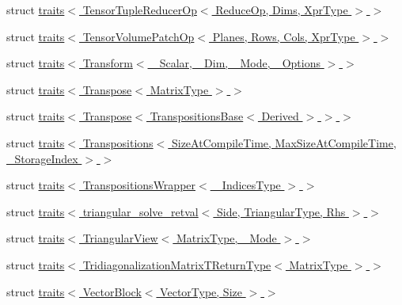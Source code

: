 \begin{DoxyCompactItemize}
\item 
struct \hyperlink{struct_eigen_1_1internal_1_1traits_3_01_tensor_tuple_reducer_op_3_01_reduce_op_00_01_dims_00_01_xpr_type_01_4_01_4}{traits$<$ Tensor\+Tuple\+Reducer\+Op$<$ Reduce\+Op, Dims, Xpr\+Type $>$ $>$}
\item 
struct \hyperlink{struct_eigen_1_1internal_1_1traits_3_01_tensor_volume_patch_op_3_01_planes_00_01_rows_00_01_cols_00_01_xpr_type_01_4_01_4}{traits$<$ Tensor\+Volume\+Patch\+Op$<$ Planes, Rows, Cols, Xpr\+Type $>$ $>$}
\item 
struct \hyperlink{struct_eigen_1_1internal_1_1traits_3_01_transform_3_01___scalar_00_01___dim_00_01___mode_00_01___options_01_4_01_4}{traits$<$ Transform$<$ \+\_\+\+Scalar, \+\_\+\+Dim, \+\_\+\+Mode, \+\_\+\+Options $>$ $>$}
\item 
struct \hyperlink{struct_eigen_1_1internal_1_1traits_3_01_transpose_3_01_matrix_type_01_4_01_4}{traits$<$ Transpose$<$ Matrix\+Type $>$ $>$}
\item 
struct \hyperlink{struct_eigen_1_1internal_1_1traits_3_01_transpose_3_01_transpositions_base_3_01_derived_01_4_01_4_01_4}{traits$<$ Transpose$<$ Transpositions\+Base$<$ Derived $>$ $>$ $>$}
\item 
struct \hyperlink{struct_eigen_1_1internal_1_1traits_3_01_transpositions_3_01_size_at_compile_time_00_01_max_size_a3e3a58d21bfa7053a385355887ee81d}{traits$<$ Transpositions$<$ Size\+At\+Compile\+Time, Max\+Size\+At\+Compile\+Time, \+\_\+\+Storage\+Index $>$ $>$}
\item 
struct \hyperlink{struct_eigen_1_1internal_1_1traits_3_01_transpositions_wrapper_3_01___indices_type_01_4_01_4}{traits$<$ Transpositions\+Wrapper$<$ \+\_\+\+Indices\+Type $>$ $>$}
\item 
struct \hyperlink{struct_eigen_1_1internal_1_1traits_3_01triangular__solve__retval_3_01_side_00_01_triangular_type_00_01_rhs_01_4_01_4}{traits$<$ triangular\+\_\+solve\+\_\+retval$<$ Side, Triangular\+Type, Rhs $>$ $>$}
\item 
struct \hyperlink{struct_eigen_1_1internal_1_1traits_3_01_triangular_view_3_01_matrix_type_00_01___mode_01_4_01_4}{traits$<$ Triangular\+View$<$ Matrix\+Type, \+\_\+\+Mode $>$ $>$}
\item 
struct \hyperlink{struct_eigen_1_1internal_1_1traits_3_01_tridiagonalization_matrix_t_return_type_3_01_matrix_type_01_4_01_4}{traits$<$ Tridiagonalization\+Matrix\+T\+Return\+Type$<$ Matrix\+Type $>$ $>$}
\item 
struct \hyperlink{struct_eigen_1_1internal_1_1traits_3_01_vector_block_3_01_vector_type_00_01_size_01_4_01_4}{traits$<$ Vector\+Block$<$ Vector\+Type, Size $>$ $>$}

\end{DoxyCompactItemize}
